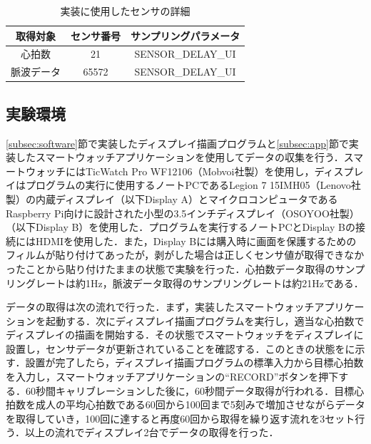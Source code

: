 \documentclass[Japanese,noauthor]{dicomopapers}
\begin{document}
\begin{table}[!t]
  \centering
  \caption{実装に使用したセンサの詳細}
  \begin{tabular}{c|c|c} \hline\hline
    取得対象 & センサ番号 & サンプリングパラメータ \\ \hline
    心拍数 & 21 & SENSOR\_DELAY\_UI \\
    脈波データ & 65572 & SENSOR\_DELAY\_UI \\ \hline
  \end{tabular}
  \label{tab:sensor_param}
\end{table}


\subsection{実験環境}
\ref{subsec:software}節で実装したディスプレイ描画プログラムと\ref{subsec:app}節で実装したスマートウォッチアプリケーションを使用してデータの収集を行う．スマートウォッチにはTicWatch Pro WF12106（Mobvoi社製）を使用し，ディスプレイはプログラムの実行に使用するノートPCであるLegion 7 15IMH05（Lenovo社製）の内蔵ディスプレイ（以下Display A）とマイクロコンピュータであるRaspberry Pi向けに設計された小型の3.5インチディスプレイ（OSOYOO社製）（以下Display B）を使用した．プログラムを実行するノートPCとDisplay Bの接続にはHDMIを使用した．また，Display Bには購入時に画面を保護するためのフィルムが貼り付けてあったが，剥がした場合は正しくセンサ値が取得できなかったことから貼り付けたままの状態で実験を行った．心拍数データ取得のサンプリングレートは約1Hz，脈波データ取得のサンプリングレートは約21Hzである．

データの取得は次の流れで行った．まず，実装したスマートウォッチアプリケーションを起動する．次にディスプレイ描画プログラムを実行し，適当な心拍数でディスプレイの描画を開始する．その状態でスマートウォッチをディスプレイに設置し，センサデータが更新されていることを確認する．このときの状態をに示す．設置が完了したら，ディスプレイ描画プログラムの標準入力から目標心拍数を入力し，スマートウォッチアプリケーションの``RECORD''ボタンを押下する．60秒間キャリブレーションした後に，60秒間データ取得が行われる．目標心拍数を成人の平均心拍数である60回から100回\cite{heart_rate_average}まで5刻みで増加させながらデータを取得していき，100回に達すると再度60回から取得を繰り返す流れを3セット行う．以上の流れでディスプレイ2台でデータの取得を行った．
\end{document}

